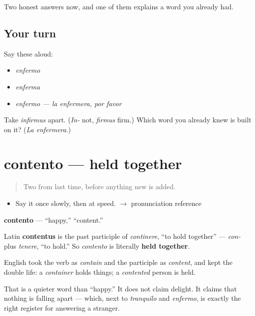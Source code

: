 \begin{grammarlens}[title={What you've built}]
Two honest answers now, and one of them explains a word you already had.
\end{grammarlens}

\subsection*{Your turn}
Say these aloud:

\begin{itemize}
\raggedright
  \item \emph{enfermo}
  \item \emph{enferma}
  \item \emph{enfermo — la enfermera, por favor}
\end{itemize}

\begin{tcolorbox}[breakable,colback=teal!4,colframe=teal!35!black,title={Before you move on}]
Take \emph{infirmus} apart. (\emph{In-} not, \emph{firmus} firm.) Which word you already knew is built on it? (\emph{La enfermera}.)
\end{tcolorbox}
\section[contento]{contento — held together}

\label{lesson:ES-C304-contento}



\begin{quote}
Two from last time, before anything new is added.
\end{quote}

\begin{sounds}
\begin{itemize}
\raggedright
  \item Say it once slowly, then at speed. $\to$ pronunciation reference
\end{itemize}
\end{sounds}

\begin{cousinweb}
\textbf{contento} — \textquotedblleft{}happy,\textquotedblright{} \textquotedblleft{}content.\textquotedblright{}

Latin \textbf{contentus} is the past participle of \emph{continere}, \textquotedblleft{}to hold together\textquotedblright{} — \emph{con-} plus \emph{tenere}, \textquotedblleft{}to hold.\textquotedblright{} So \emph{contento} is literally \textbf{held together}.

English took the verb as \emph{contain} and the participle as \emph{content}, and kept the double life: a \emph{container} holds things; a \emph{contented} person is held.

That is a quieter word than \textquotedblleft{}happy.\textquotedblright{} It does not claim delight. It claims that nothing is falling apart — which, next to \emph{tranquilo} and \emph{enfermo}, is exactly the right register for answering a stranger.
\end{cousinweb}

